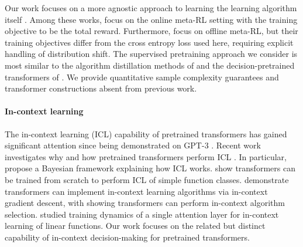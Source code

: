 \documentclass[10pt]{article}
\begin{document}
Our work focuses on a more agnostic approach to learning the learning algorithm itself \citep{wang2016learning, duan2016rl, dorfman2021offline, mitchell2021offline, li2020focal, pong2022offline, laskin2022context, lee2023supervised}. Among these works, \cite{wang2016learning, duan2016rl} focus on the online meta-RL setting with the training objective to be the total reward. Furthermore, \cite{dorfman2021offline, mitchell2021offline, li2020focal, pong2022offline} focus on offline meta-RL, but their training objectives differ from the cross entropy loss used here, requiring explicit handling of distribution shift. The supervised pretraining approach we consider is most similar to the algorithm distillation methods of \cite{laskin2022context} and the decision-pretrained transformers of \cite{lee2023supervised}. We provide quantitative sample complexity guarantees and transformer constructions absent from previous work. 


\paragraph{In-context learning}

The in-context learning (ICL) capability of pretrained transformers has gained significant attention since being demonstrated on GPT-3 \cite{brown2020language}. Recent work investigates why and how pretrained transformers perform ICL \citep{garg2022can, li2023transformers, von2023transformers, akyurek2022learning, xie2021explanation, bai2023transformers, 
zhang2023trained, ahn2023transformers, raventos2023pretraining}. In particular, \cite{xie2021explanation} propose a Bayesian framework explaining how ICL works. \cite{garg2022can} show transformers can be trained from scratch to perform ICL of simple function classes.  \cite{von2023transformers, akyurek2022learning, bai2023transformers} demonstrate transformers can implement in-context learning algorithms via in-context gradient descent, with \cite{bai2023transformers} showing transformers can perform in-context algorithm selection. \cite{zhang2023trained} studied training dynamics of a single attention layer for in-context learning of linear functions. Our work focuses on the related but distinct capability of in-context decision-making for pretrained transformers. 
\end{document}
